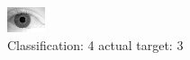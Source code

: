 \begin{figure}[h!]
\begin{center}
\includegraphics[width=0.60\columnwidth]{figures/ID2199_class_4_target_3.png}
\end{center}
\caption{ Classification: 4 actual target: 3}
\label{fig:ID2199_class_4_target_3}
\end{figure}
